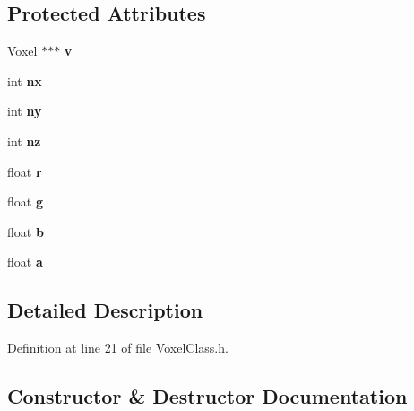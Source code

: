 \subsection*{Protected Attributes}
\begin{DoxyCompactItemize}
\item 
\mbox{\label{class_sculptor_a4ca53a2f2fbf41ca42dfe729ebe693f1}} 
\mbox{\hyperlink{struct_voxel}{Voxel}} $\ast$$\ast$$\ast$ {\bfseries v}
\item 
\mbox{\label{class_sculptor_ad1e32f9042538419a3bc7b376f7813b8}} 
int {\bfseries nx}
\item 
\mbox{\label{class_sculptor_a1ce2ff97ec94927928ab3f5ec4ba6761}} 
int {\bfseries ny}
\item 
\mbox{\label{class_sculptor_a33204e7df26a7ee4c7192381a24335d3}} 
int {\bfseries nz}
\item 
\mbox{\label{class_sculptor_a3f5d2ec3b66d645019b8d81c810a1cd8}} 
float {\bfseries r}
\item 
\mbox{\label{class_sculptor_a208c06af69a81a1568df4493868816f1}} 
float {\bfseries g}
\item 
\mbox{\label{class_sculptor_a7aafd7305ea634252d8288b60536cd96}} 
float {\bfseries b}
\item 
\mbox{\label{class_sculptor_a6fd0157dcf17582f0edd5fddf157604e}} 
float {\bfseries a}
\end{DoxyCompactItemize}


\subsection{Detailed Description}


Definition at line 21 of file Voxel\+Class.\+h.



\subsection{Constructor \& Destructor Documentation}
\mbox{\label{class_sculptor_a014e3ef5517bf0e9d9e14486b6ac6433}} 
